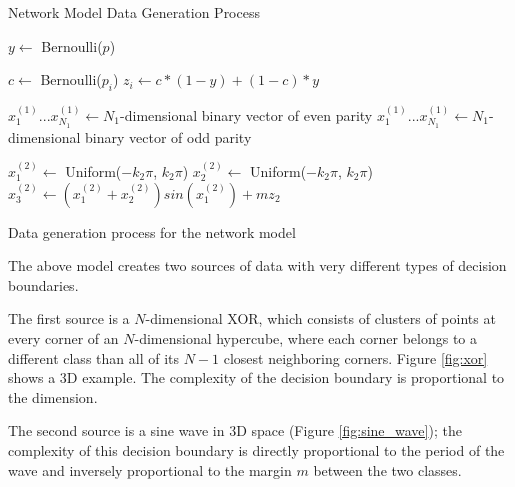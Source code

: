 \documentclass{article}
\begin{document}
\begin{algorithm}
\centering
\begin{algorithmic}[1]
    \caption{Network Model Data Generation Process}
    \item[] 
    \State $y \leftarrow$ Bernoulli($p$)

    \item[]
    \item[] 
        \State $c \leftarrow$ Bernoulli($p_i$) 
        \State $z_i \leftarrow c * (1-y) + (1-c) * y$ 
    \EndFor

    \item[]
    \item[] 
        \State $x^{(1)}_1 ... x^{(1)}_{N_1} \leftarrow N_1$-dimensional binary
        vector of even parity
    \Else
        \State $x^{(1)}_1 ... x^{(1)}_{N_1} \leftarrow N_1$-dimensional binary
        vector of odd parity
    \EndIf

    \item[]
    \item[] 
    \State $x^{(2)}_1 \leftarrow $ Uniform($-k_2\pi$, $k_2\pi$)
    \State $x^{(2)}_2 \leftarrow $ Uniform($-k_2\pi$, $k_2\pi$)
    \State $x^{(2)}_3 \leftarrow (x^{(2)}_1+x^{(2)}_2)sin(x^{(2)}_1) + mz_2$
\end{algorithmic}
\caption{Data generation process for the network model}
\label{alg:network_model}
\end{algorithm}


The above model creates two sources of data with very different types of
decision boundaries.

The first source is a $N$-dimensional XOR, which consists of clusters of points
at every corner of an $N$-dimensional hypercube, where each corner belongs to a
different class than all of its $N-1$ closest neighboring corners. Figure
\ref{fig:xor} shows a 3D example. The complexity of the decision boundary is
proportional to the dimension.

The second source is a sine wave in 3D space (Figure \ref{fig:sine_wave}); the
complexity of this decision boundary is directly proportional to the period of
the wave and inversely proportional to the margin $m$ between the two classes.
\end{document}
